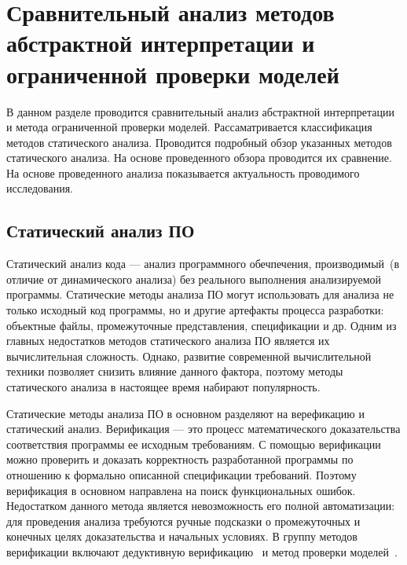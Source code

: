 \chapter{Сравнительный анализ методов абстрактной интерпретации и ограниченной 
проверки моделей}
\label{chapter:analysis}
В данном разделе проводится сравнительный анализ абстрактной интерпретации и 
метода ограниченной проверки моделей. Рассаматривается классификация методов 
статического анализа. Проводится подробный обзор указанных методов статического 
анализа. На основе проведенного обзора проводится их сравнение. На основе 
проведенного анализа показывается актуальность проводимого исследования.

\section{Статический анализ ПО}
Статический анализ кода --- анализ программного обечпечения, производимый~(в 
отличие от динамического анализа) без реального выполнения анализируемой 
программы. Статические методы анализа ПО могут использовать для анализа не 
только исходный код программы, но и другие артефакты процесса разработки:
объектные файлы, промежуточные представления, спецификации и др. Одним из
главных недостатков методов статического анализа ПО является их вычислительная
сложность. Однако, развитие современной вычислительной техники позволяет
снизить влияние данного фактора, поэтому методы статического анализа в
настоящее время набирают популярность. 

Статические методы анализа ПО в основном разделяют на верефикацию и статический
анализ. Верификация --- это процесс математического доказательства соответствия 
программы ее исходным требованиям. С помощью верификации можно проверить и
доказать корректность разработанной программы по отношению к формально
описанной спецификации требований. Поэтому верификация в основном направлена
на поиск функциональных ошибок. Недостатком данного метода является
невозможность его полной автоматизации: для проведения анализа требуются ручные
подсказки о промежуточных и конечных целях доказательства и начальных условиях.
В группу методов верификации включают дедуктивную верификацию~\cite{
deductiveVerification} и метод проверки моделей~\cite{modelChecking}.

